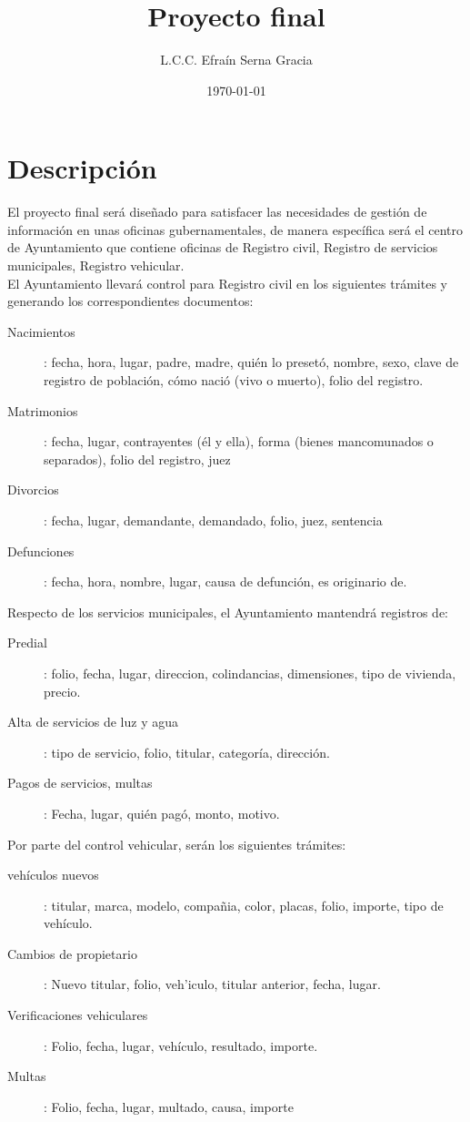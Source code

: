 \documentclass[12pt,spanish,lettersize]{article}
\title{Proyecto final}
\author{L.C.C. Efra\'in Serna Gracia}
\date{\today}
\begin{document}
\maketitle

\section{Descripci\'on}
El proyecto final ser\'a dise\~nado para satisfacer las necesidades de gesti\'on de informaci\'on en unas oficinas gubernamentales, de manera espec\'ifica ser\'a el centro de Ayuntamiento que contiene oficinas de Registro civil, Registro de servicios municipales, Registro vehicular.\\

El Ayuntamiento llevar\'a control para Registro civil en los siguientes tr\'amites y generando los correspondientes documentos:
\begin{description}
\item [Nacimientos]: fecha, hora, lugar, padre, madre, qui\'en lo preset\'o, nombre, sexo, clave de registro de poblaci\'on, c\'omo naci\'o (vivo o muerto), folio del registro.
\item [Matrimonios]: fecha, lugar, contrayentes (\'el y ella), forma (bienes mancomunados o separados), folio del registro, juez
\item [Divorcios]: fecha, lugar, demandante, demandado, folio, juez, sentencia
\item [Defunciones]: fecha, hora, nombre, lugar, causa de defunci\'on, es originario de.
\end{description}

Respecto de los servicios municipales, el Ayuntamiento mantendr\'a registros de:
\begin{description}
\item [Predial]: folio, fecha, lugar, direccion, colindancias, dimensiones, tipo de vivienda, precio.
\item [Alta de servicios de luz y agua]: tipo de servicio, folio, titular, categor\'ia, direcci\'on.
\item [Pagos de servicios, multas]: Fecha, lugar, qui\'en pag\'o, monto, motivo.
\end{description}

Por parte del control vehicular, serán los siguientes trámites:
\begin{description}
\item [veh\'iculos nuevos]: titular, marca, modelo, compa\~nia, color, placas, folio, importe, tipo de veh\'iculo.
\item [Cambios de propietario]: Nuevo titular, folio, veh\a'iculo, titular anterior, fecha, lugar.
\item [Verificaciones vehiculares]: Folio, fecha, lugar, veh\'iculo, resultado, importe.
\item [Multas]: Folio, fecha, lugar, multado, causa, importe
\end{description}
\end{document}
